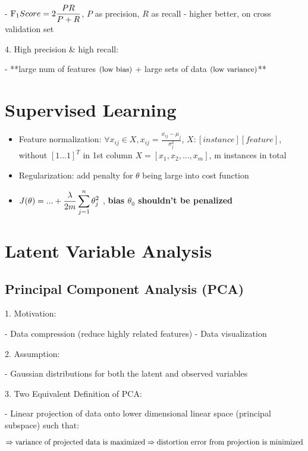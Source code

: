 - $\displaystyle \text{F}_1 \space  Score = 2\frac{PR}{P+R}$, $P$ as precision, $R$ as recall
- higher better, on cross validation set

4. High precision \& high recall:

- **large num of features $\small\text{(low bias)}$ + large sets of data $\small\text{(low variance)}$**


\section{Supervised Learning}
\begin{itemize}

\item Feature normalization: $\forall x_{ij} \in X, x_{ij}=\frac{x_{ij}-\mu_j}{\sigma_j^2}$, $ X:[instance][feature]$, without $[1...1]^T$ in 1st column $X=[x_1,x_2,...,x_m]$, m instances in total
\item Regularization: add penalty for $\theta$ being large into cost function
\item $\displaystyle J(\theta)= \space... + \frac{\lambda}{2m}\sum^n_{j=1}\theta_j^2$ , \textbf{bias $\theta_0$ shouldn't be penalized} 

\end{itemize}


\section{Latent Variable Analysis}

\subsection{Principal Component Analysis (PCA)}

1. Motivation:

- Data compression (reduce highly related features)
- Data visualization

2. Assumption:

- Gaussian distributions for both the latent and observed variables

3. Two Equivalent Definition of PCA:

- Linear projection of data onto lower dimensional linear space (principal subspace) such that: 

$\Rightarrow \text{variance of projected data is maximized} \\ \Rightarrow \text{distortion error from projection is minimized} $ 

